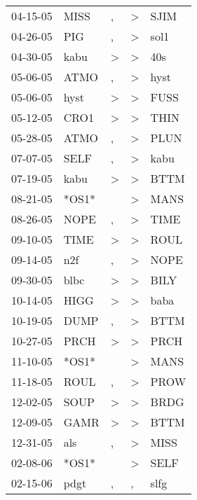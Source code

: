 \begin{supertabular}{lllll}
 04-15-05 &   MISS &                , &     \textgreater &   SJIM \\
 04-26-05 &    PIG &                , &     \textgreater &   sol1 \\
 04-30-05 &   kabu &     \textgreater &     \textgreater &    40s \\
 05-06-05 &   ATMO &                , &     \textgreater &   hyst \\
 05-06-05 &   hyst &     \textgreater &     \textgreater &   FUSS \\
 05-12-05 &   CRO1 &     \textgreater &     \textgreater &   THIN \\
 05-28-05 &   ATMO &                , &     \textgreater &   PLUN \\
 07-07-05 &   SELF &                , &     \textgreater &   kabu \\
 07-19-05 &   kabu &     \textgreater &     \textgreater &   BTTM \\
 08-21-05 &  *OS1* &                  &     \textgreater &   MANS \\
 08-26-05 &   NOPE &                , &     \textgreater &   TIME \\
 09-10-05 &   TIME &     \textgreater &     \textgreater &   ROUL \\
 09-14-05 &    n2f &                , &     \textgreater &   NOPE \\
 09-30-05 &   blbc &     \textgreater &     \textgreater &   BILY \\
 10-14-05 &   HIGG &     \textgreater &     \textgreater &   baba \\
 10-19-05 &   DUMP &                , &     \textgreater &   BTTM \\
 10-27-05 &   PRCH &     \textgreater &     \textgreater &   PRCH \\
 11-10-05 &  *OS1* &                  &     \textgreater &   MANS \\
 11-18-05 &   ROUL &                , &     \textgreater &   PROW \\
 12-02-05 &   SOUP &     \textgreater &     \textgreater &   BRDG \\
 12-09-05 &   GAMR &     \textgreater &     \textgreater &   BTTM \\
 12-31-05 &    als &                , &     \textgreater &   MISS \\
 02-08-06 &  *OS1* &                  &     \textgreater &   SELF \\
 02-15-06 &   pdgt &                , &                , &   slfg \\

\end{supertabular}
